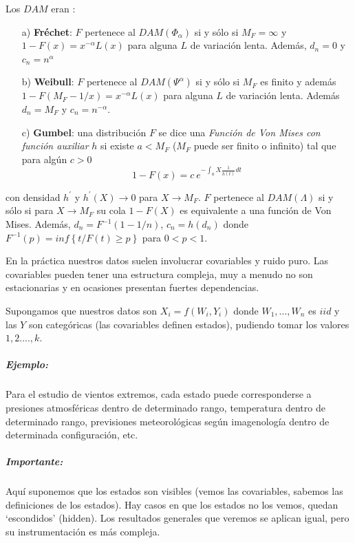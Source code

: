 \documentclass[
  12pt]{article}
\begin{document}
Los \(DAM\) eran :

\begin{itemize}
\item[a)] \textbf{Fréchet}: $F$ pertenece al $DAM(\Phi_{\alpha})$ si y sólo si $M_F= \infty$ y $1-F(x)=x^{-\alpha} L(x)$ para alguna $L$ de variación lenta. Además, $d_n=0$ y $c_n= n^{\alpha}$
\item[b)] \textbf{Weibull}: $F$ pertenece al $DAM(\Psi^{\alpha})$ si y sólo si $M_F$ es finito y además $1-F(M_F -1/x)=x^{-\alpha} L(x)$ para alguna $L$ de variación lenta. Además $d_n= M_F$ y $c_n= n^{-\alpha}$.
\item[c)] \textbf{Gumbel}: una distribución $F$ se dice una \textit{Función de Von Mises con función auxiliar} $h$ si existe $a < M_F$ ($M_F$
puede ser finito o infinito) tal que para algún $c>0$
\begin{equation}
1-F(x)=c\:e^{-\int_a X \frac{1}{h(t)}dt}
\end{equation}
\end{itemize}

con densidad \(h^{\prime}\) y \(h^{\prime}(X)\longrightarrow 0\) para
\(X\longrightarrow M_F\). \(F\) pertenece al \(DAM(\Lambda)\) si y sólo
si para \(X\longrightarrow M_F\) su cola \(1-F(X)\) es equivalente a una
función de Von Mises. Además, \(d_n=F^{-1}(1-1/n)\), \(c_n=h(d_n)\)
donde \(F^{-1}(p)=inf\left\{ t / F(t)\geq p  \right\}\) para \(0<p<1\).

En la práctica nuestros datos suelen involucrar covariables y ruido
puro. Las covariables pueden tener una estructura compleja, muy a menudo
no son estacionarias y en ocasiones presentan fuertes dependencias.

Supongamos que nuestros datos son \(X_i=f(W_i,Y_i)\) donde
\(W_1,...,W_n\) es \(iid\) y las \(Y\) son categóricas (las covariables
definen estados), pudiendo tomar los valores \(1,2....,k\).

\subparagraph{Ejemplo:}\label{ejemplo}

Para el estudio de vientos extremos, cada estado puede corresponderse a
presiones atmosféricas dentro de determinado rango, temperatura dentro
de determinado rango, previsiones meteorológicas según imagenología
dentro de determinada configuración, etc.

\subparagraph{Importante:}\label{importante}

Aquí suponemos que los estados son visibles (vemos las covariables,
sabemos las definiciones de los estados). Hay casos en que los estados
no los vemos, quedan `escondidos' (hidden). Los resultados generales que
veremos se aplican igual, pero su instrumentación es más compleja.
\end{document}
